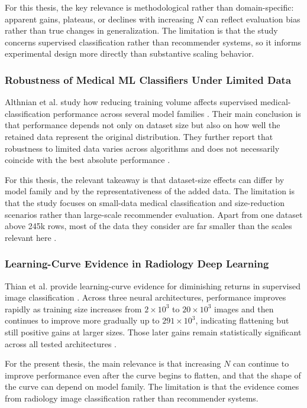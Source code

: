 \documentclass[12pt,a4paper]{article}
\begin{document}
For this thesis, the key relevance is methodological rather than domain-specific: apparent gains, plateaus, or declines with increasing $N$ can reflect evaluation bias rather than true changes in generalization. The limitation is that the study concerns supervised classification rather than recommender systems, so it informs experimental design more directly than substantive scaling behavior.

\subsubsection{Robustness of Medical ML Classifiers Under Limited Data}
Althnian et al. study how reducing training volume affects supervised medical-classification performance across several model families \cite{althnian2021}. Their main conclusion is that performance depends not only on dataset size but also on how well the retained data represent the original distribution. They further report that robustness to limited data varies across algorithms and does not necessarily coincide with the best absolute performance \cite{althnian2021}.

For this thesis, the relevant takeaway is that dataset-size effects can differ by model family and by the representativeness of the added data. The limitation is that the study focuses on small-data medical classification and size-reduction scenarios rather than large-scale recommender evaluation. Apart from one dataset above 245k rows, most of the data they consider are far smaller than the scales relevant here \cite{althnian2021}.

\subsubsection{Learning-Curve Evidence in Radiology Deep Learning}
Thian et al. provide learning-curve evidence for diminishing returns in supervised image classification \cite{thian2022}. Across three neural architectures, performance improves rapidly as training size increases from $2\times 10^3$ to $20\times 10^3$ images and then continues to improve more gradually up to $291\times 10^3$, indicating flattening but still positive gains at larger sizes. Those later gains remain statistically significant across all tested architectures \cite{thian2022}.

For the present thesis, the main relevance is that increasing $N$ can continue to improve performance even after the curve begins to flatten, and that the shape of the curve can depend on model family. The limitation is that the evidence comes from radiology image classification rather than recommender systems.
\end{document}
